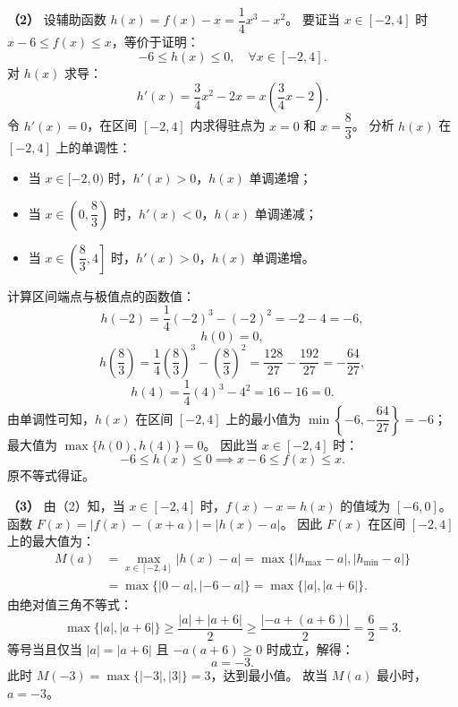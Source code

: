 \begin{answer}
\textbf{（2）}
设辅助函数 $h(x) = f(x) - x = \dfrac{1}{4}x^3 - x^2$。
要证当 $x \in [-2, 4]$ 时 $x - 6 \leqslant f(x) \leqslant x$，等价于证明：
\nopagebreak[4]
\[-6 \leqslant h(x) \leqslant 0, \quad \forall x \in [-2, 4].\]
对 $h(x)$ 求导：
\nopagebreak[4]
\[h'(x) = \dfrac{3}{4}x^2 - 2x = x\left(\dfrac{3}{4}x - 2\right).\]
令 $h'(x) = 0$，在区间 $[-2, 4]$ 内求得驻点为 $x = 0$ 和 $x = \dfrac{8}{3}$。
分析 $h(x)$ 在 $[-2, 4]$ 上的单调性：
\begin{itemize}
\item 当 $x \in [-2, 0)$ 时，$h'(x) > 0$，$h(x)$ 单调递增；
\item 当 $x \in \left(0, \dfrac{8}{3}\right)$ 时，$h'(x) < 0$，$h(x)$ 单调递减；
\item 当 $x \in \left(\dfrac{8}{3}, 4\right]$ 时，$h'(x) > 0$，$h(x)$ 单调递增。
\end{itemize}
计算区间端点与极值点的函数值：
\nopagebreak[4]
\[h(-2) = \dfrac{1}{4}(-2)^3 - (-2)^2 = -2 - 4 = -6,\]
\nopagebreak[4]
\[h(0) = 0,\]
\nopagebreak[4]
\[h\left(\dfrac{8}{3}\right) = \dfrac{1}{4}\left(\dfrac{8}{3}\right)^3 - \left(\dfrac{8}{3}\right)^2 = \dfrac{128}{27} - \dfrac{192}{27} = -\dfrac{64}{27},\]
\nopagebreak[4]
\[h(4) = \dfrac{1}{4}(4)^3 - 4^2 = 16 - 16 = 0.\]
由单调性可知，$h(x)$ 在区间 $[-2, 4]$ 上的最小值为 $\min\left\{-6, -\dfrac{64}{27}\right\} = -6$；
最大值为 $\max\{h(0), h(4)\} = 0$。
因此当 $x \in [-2, 4]$ 时：
\nopagebreak[4]
\[-6 \leqslant h(x) \leqslant 0 \implies x - 6 \leqslant f(x) \leqslant x.\]
原不等式得证。

\textbf{（3）}
由（2）知，当 $x \in [-2, 4]$ 时，$f(x) - x = h(x)$ 的值域为 $[-6, 0]$。
函数 $F(x) = |f(x) - (x + a)| = |h(x) - a|$。
因此 $F(x)$ 在区间 $[-2, 4]$ 上的最大值为：
\nopagebreak[4]
\[\begin{aligned}
M(a) &= \max_{x \in [-2, 4]} |h(x) - a| = \max\{|h_{\max} - a|, |h_{\min} - a|\} \\
&= \max\{|0 - a|, |-6 - a|\} = \max\{|a|, |a + 6|\}.
\end{aligned}\]
由绝对值三角不等式：
\nopagebreak[4]
\[\max\{|a|, |a + 6|\} \geqslant \dfrac{|a| + |a + 6|}{2} \geqslant \dfrac{|-a + (a + 6)|}{2} = \dfrac{6}{2} = 3.\]
等号当且仅当 $|a| = |a + 6|$ 且 $-a(a + 6) \geqslant 0$ 时成立，解得：
\nopagebreak[4]
\[a = -3.\]
此时 $M(-3) = \max\{|-3|, |3|\} = 3$，达到最小值。
故当 $M(a)$ 最小时，$a = -3$。




\end{answer}